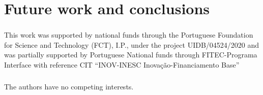 \documentclass[runningheads]{llncs}
\begin{document}

\section{Future work and conclusions}
\label{sec:conclusions}

\begin{credits}
\subsubsection{\ackname} This work was supported by national funds through the Portuguese Foundation for Science and Technology (FCT), I.P., under the project UIDB/04524/2020 and was partially supported by Portuguese National funds through FITEC-Programa Interface with reference CIT “INOV-INESC Inovação-Financiamento Base”

\subsubsection{\discintname}
The authors have no competing interests.
\end{credits}
%
%
%


%
\end{document}
